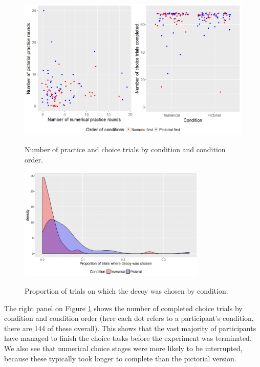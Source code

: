 \documentclass[11pt,a4paper]{article}
\begin{document}
\begin{figure}[ht]
\centering
\caption{Number of practice and choice trials by condition and condition order.}
\includegraphics[width=1\textwidth]{Explor_teapot.png}
\label{fig:Explor_teapot}
\end{figure}


\begin{figure}
\centering
\caption{Proportion of trials on which the decoy was chosen by condition.}
\includegraphics[width=0.8\textwidth]{Explor_teapot_dec.png}
\label{fig:Explor_teapot_dec}
\end{figure}

The right panel on Figure \ref{fig:Explor_teapot} shows the number of completed choice trials by condition and condition order (here each dot refers to a participant's condition, there are 144 of these overall). This shows that the vast majority of participants have managed to finish the choice tasks before the experiment was terminated. We also see that numerical choice stages were more likely to be interrupted, because these typically took longer to complete than the pictorial version.
\end{document}
